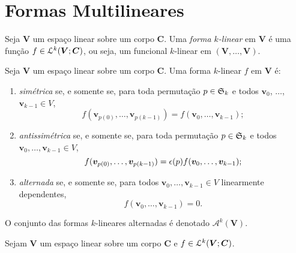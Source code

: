 \section{Formas Multilineares}

\begin{defi}
Seja $\bm V$ um espaço linear sobre um corpo $\bm C$. Uma \emph{forma $k$-linear} em $\bm V$ é uma função $f \in \mathcal{L}^k(\bm V;\bm C)$, ou seja, um funcional $k$-linear em $(\bm V,\ldots,\bm V)$.
\end{defi}

\begin{defi}
Seja $\bm V$ um espaço linear sobre um corpo $\bm C$. Uma forma $k$-linear $f$ em $\bm V$ é:
\begin{enumerate}
\item \emph{simétrica} se, e somente se, para toda permutação $p \in \mathfrak{S}_k$ e todos $\bm v_0$, $\ldots$, $\bm v_{k-1} \in V$,
	\begin{equation*}
	f(\bm v_{p(0)},\ldots,\bm v_{p(k-1)}) = f(\bm v_0,\ldots,\bm v_{k-1});
	\end{equation*}
\item \emph{antissimétrica} se, e somente se, para toda permutação $p \in \mathfrak{S}_k$ e todos $\bm v_0,\ldots,\bm v_{k-1} \in V$,
	\begin{equation*}
	f(\bm v_{p(0)},\ldots,\bm v_{p(k-1)}) = \epsilon(p) f(\bm v_0,\ldots,\bm v_{k-1});
	\end{equation*}
\item \emph{alternada} se, e somente se, para todos $\bm v_0,\ldots,\bm v_{k-1} \in V$ linearmente dependentes,
	\begin{equation*}
	f(\bm v_0,\ldots,\bm v_{k-1}) = 0.
	\end{equation*}
\end{enumerate}
O conjunto das formas $k$-lineares alternadas é denotado $\mathcal A^k(\bm V)$.
\end{defi}

\begin{prop}
Sejam $\bm V$ um espaço linear sobre um corpo $\bm C$ e $f \in \mathcal{L}^k(\bm V;\bm C)$.
\end{prop}

